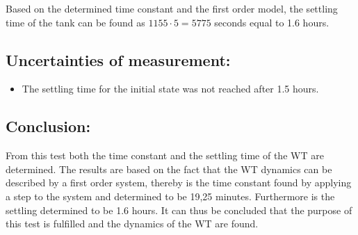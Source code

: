 Based on the determined time constant and the first order model, the settling time of the tank can be found as $1155\cdot 5 = 5775$ seconds equal to 1.6 hours.

\subsection*{Uncertainties of measurement:}
\begin{itemize}
\item The settling time for the initial state was not reached after 1.5 hours.
\end{itemize}

\subsection*{Conclusion:}
From this test both the time constant and the settling time of the WT are determined. The results are based on the fact that the WT dynamics can be described by a first order system, thereby is the time constant found by applying a step to the system and determined to be 19,25 minutes. Furthermore is the settling determined to be 1.6 hours. It can thus be concluded that the purpose of this test is fulfilled and the dynamics of the WT are found.  